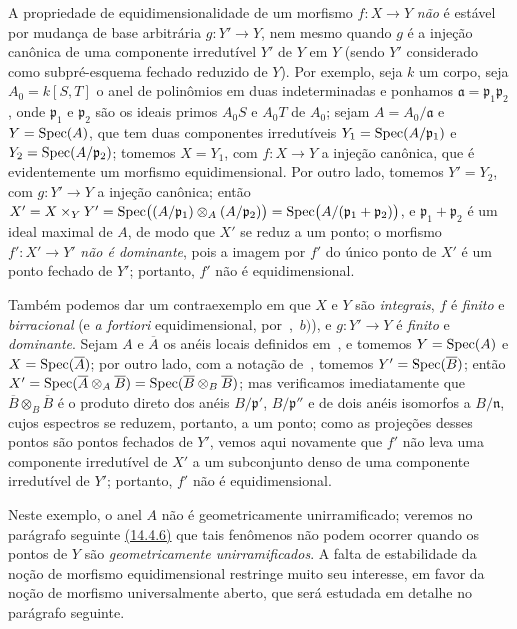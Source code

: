 \begin{remarks}[13.3.9]
\label{IV.13.3.9}
A propriedade de equidimensionalidade de um morfismo $f:X\to Y$ \emph{não}
é estável por mudança de base arbitrária $g:Y'\to Y$, nem mesmo quando $g$
é a injeção canônica de uma componente irredutível $Y'$ de $Y$ em $Y$
(sendo $Y'$
considerado como subpré-esquema fechado reduzido de $Y$).
Por exemplo, seja $k$ um corpo, seja $A_0=k[S,T]$ o anel de polinômios em
duas indeterminadas e ponhamos $\mathfrak{a}=\mathfrak{p}_1\mathfrak{p}_2$,
onde $\mathfrak{p}_1$ e $\mathfrak{p}_2$ são os ideais primos $A_0S$ e
$A_0T$ de $A_0$; sejam $A=A_0/\mathfrak{a}$ e $Y=\operatorname{Spec}(A)$, que tem duas
componentes irredutíveis $Y_1=\operatorname{Spec}(A/\mathfrak{p}_1)$ e
$Y_2=\operatorname{Spec}(A/\mathfrak{p}_2)$; tomemos $X=Y_1$, com $f:X\to Y$ a injeção
canônica, que é evidentemente um morfismo equidimensional.
Por outro lado, tomemos $Y'=Y_2$, com $g:Y'\to Y$ a injeção canônica; então
$X'=X\times_Y Y'=\operatorname{Spec}\bigl((A/\mathfrak{p}_1)\otimes_A(A/\mathfrak{p}_2)\bigr)=\operatorname{Spec}\bigl(A/(\mathfrak{p}_1+\mathfrak{p}_2)\bigr)$,
e $\mathfrak{p}_1+\mathfrak{p}_2$ é um ideal maximal de $A$, de modo que
$X'$ se reduz a um ponto; o morfismo $f':X'\to Y'$ \emph{não é dominante},
pois a imagem por $f'$ do único ponto de $X'$ é um ponto fechado de $Y'$;
portanto, $f'$ não é equidimensional.

Também podemos dar um contraexemplo em que $X$ e $Y$ são \emph{integrais},
$f$ é \emph{finito} e \emph{birracional} (e \emph{a fortiori} equidimensional,
por~,~$b)$), e $g:Y'\to Y$ é \emph{finito} e \emph{dominante}.
Sejam $A$ e $\overline{A}$ os anéis locais definidos em~,
e tomemos $Y=\operatorname{Spec}(A)$ e $X=\operatorname{Spec}(\overline{A})$; por outro lado, com a
notação de~, tomemos $Y'=\operatorname{Spec}(\overline{B})$; então
$X'=\operatorname{Spec}(\overline{A}\otimes_A\overline{B})=\operatorname{Spec}(\overline{B}\otimes_B\overline{B})$;
mas verificamos imediatamente que $\overline{B}\otimes_B\overline{B}$ é
o produto direto dos anéis $B/\mathfrak{p}'$, $B/\mathfrak{p}''$ e de dois
anéis isomorfos a $B/\mathfrak{n}$, cujos espectros se reduzem, portanto,
a um ponto; como as projeções desses pontos são pontos fechados de $Y'$,
vemos aqui novamente que $f'$ não leva uma componente irredutível de $X'$
a um subconjunto denso de uma componente irredutível de $Y'$;
portanto, $f'$ não é equidimensional.

Neste exemplo, o anel $A$ não é geometricamente unirramificado; veremos no
parágrafo seguinte {\hyperlink{ega4.c04.cor.14-4-6}{(14.4.6)}} que tais
fenômenos não podem ocorrer quando os pontos de $Y$ são
\emph{geometricamente unirramificados}.
A falta de estabilidade da noção de morfismo equidimensional restringe
muito seu interesse, em favor da noção de morfismo universalmente aberto,
que será estudada em detalhe no parágrafo seguinte.
\end{remarks}

